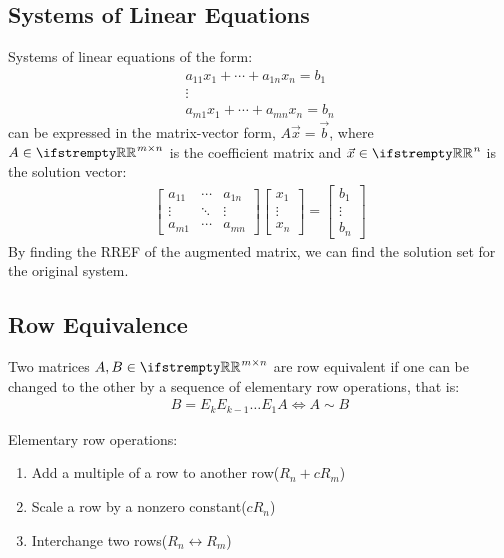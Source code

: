 \documentclass[12pt, a4paper]{article}
\begin{document}
\begin{multicols*}{3}
\subsection{Systems of Linear Equations}
Systems of linear equations of the form:
\begin{gather*}
  a_{11}x_1 + \cdots + a_{1n}x_n = b_1 \\
  \vdots \\
  a_{m1}x_1 + \cdots + a_{mn}x_n = b_n
\end{gather*}
can be expressed in the matrix-vector form, $A\vec{x} = \vec{b}$, where $A \in \RR^{m{\times}n}$ is the coefficient matrix and $\vec{x} \in \RR^n$ is the solution vector:
\begin{gather*}
  \begin{bmatrix}a_{11} & \cdots & a_{1n} \\ \vdots & \ddots & \vdots \\ a_{m1} & \cdots & a_{mn}\end{bmatrix}\begin{bmatrix}x_1 \\ \vdots \\ x_n \end{bmatrix} = \begin{bmatrix}b_1 \\ \vdots \\ b_n \end{bmatrix}
\end{gather*}
By finding the RREF of the augmented matrix, we can find the solution set for the original system.

\subsection{Row Equivalence}
Two matrices $A, B \in \RR^{m{\times}n}$ are row equivalent if one can be changed to the other by a sequence of elementary row operations, that is:
\begin{align*}
  B = E_kE_{k-1}{\ldots}E_1A \iff A \sim B
\end{align*}

Elementary row operations:
\begin{enumerate}[\roman*.]
  \item Add a multiple of a row to another row\hfill($R_n + cR_m$)
  \item Scale a row by a nonzero constant\hfill($cR_n$)
  \item Interchange two rows\hfill($R_n \leftrightarrow R_m$)
\end{enumerate}


\end{multicols*}
\end{document}
